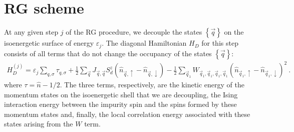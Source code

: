 \documentclass{revtex4-2}
\begin{document}
\section{RG scheme}
At any given step \(j\) of the RG procedure, we decouple the states \(\left\{ \vec q \right\} \) on the isoenergetic surface of energy \(\varepsilon_j\). The diagonal Hamiltonian \(H_D\) for this step consists of all terms that do not change the occupancy of the states \(\left\{\vec q\right\}\):
\begin{equation}\begin{aligned}
	H_D^{(j)} = \varepsilon_j\sum_{q,\sigma}\tau_{q,\sigma} + \frac{1}{2}\sum_{\vec q}J_{\vec q, \vec q}S_d^z\left(\hat n_{\vec q, \uparrow} - \hat n_{\vec q, \downarrow}\right) - \frac{1}{2}\sum_{\vec q_1}W_{\vec q_1, \vec q_1, \vec q_1, \vec q_1}\left(\hat n_{\vec q_1, \uparrow} - \hat n_{\vec q_1, \downarrow}\right)^2~.
\end{aligned}\end{equation}
where \(\tau = \hat n - 1/2\). The three terms, respectively, are the kinetic energy of the momentum states on the isoenergetic shell that we are decoupling, the Ising interaction energy between the impurity spin and the spins formed by these momentum states and, finally, the local correlation energy associated with these states arising from the \(W\) term.
\end{document}

